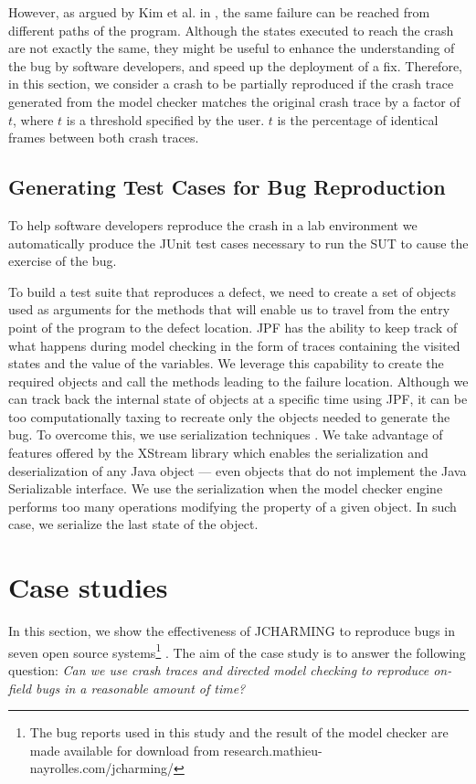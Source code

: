 However, as argued by Kim et al. in \cite{Kim2013b}, the same failure can
be reached from different paths of the program. Although the
states executed to reach the crash are not exactly the same,
they might be useful to enhance the understanding of the bug
by software developers, and speed up the deployment of a fix.
Therefore, in this section, we consider a crash to be partially
reproduced if the crash trace generated from the model
checker matches the original crash trace by a factor of $t$, where
$t$ is a threshold specified by the user. $t$ is the percentage of
identical frames between both crash traces.

\subsection{Generating Test Cases for Bug Reproduction}

To help software developers reproduce the crash in a lab
environment we automatically produce the JUnit test cases
necessary to run the SUT to cause the exercise of the bug.

To build a test suite that reproduces a defect, we need to create
a set of objects used as arguments for the methods that will
enable us to travel from the entry point of the program to the
defect location. JPF has the ability to keep track of what
happens during model checking in the form of traces
containing the visited states and the value of the variables. We
leverage this capability to create the required objects and call
the methods leading to the failure location. Although we can
track back the internal state of objects at a specific time using
JPF, it can be too computationally taxing to recreate only the
objects needed to generate the bug. To overcome this, we use
serialization techniques \cite{Opyrchal1999}. We take advantage of features
offered by the XStream \cite{Xstream2011} library which enables the
serialization and deserialization of any Java object — even
objects that do not implement the Java Serializable interface.
We use the serialization when the model checker engine
performs too many operations modifying the property of a
given object. In such case, we serialize the last state of the
object.

\section{Case studies}

In this section, we show the effectiveness of JCHARMING to
reproduce bugs in seven open source systems\footnote{The bug reports used in this study and the result of the model checker are
made available for download from research.mathieu-
nayrolles.com/jcharming/} . The aim of the
case study is to answer the following question: {\it Can we use
crash traces and directed model checking to reproduce on-
field bugs in a reasonable amount of time?}

